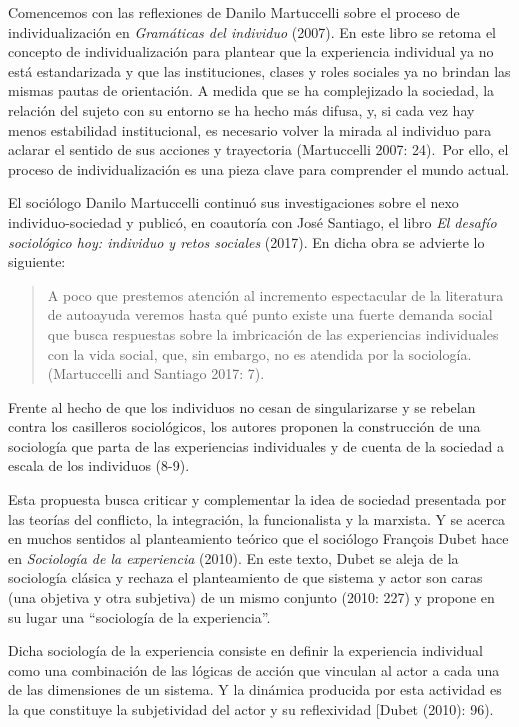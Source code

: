 \documentclass[
]{interact}
\begin{document}
Comencemos con las reflexiones de Danilo Martuccelli sobre el proceso de
individualización en \emph{Gramáticas del individuo} (2007). En este
libro se retoma el concepto de individualización para plantear que la
experiencia individual ya no está estandarizada y que las instituciones,
clases y roles sociales ya no brindan las mismas pautas de orientación.
A medida que se ha complejizado la sociedad, la relación del sujeto con
su entorno se ha hecho más difusa, y, si cada vez hay menos estabilidad
institucional, es necesario volver la mirada al individuo para aclarar
el sentido de sus acciones y trayectoria (Martuccelli 2007: 24).~Por
ello, el proceso de individualización es una pieza clave para comprender
el mundo actual.

El sociólogo Danilo Martuccelli continuó sus investigaciones sobre el
nexo individuo-sociedad y publicó, en coautoría con José Santiago, el
libro \emph{El desafío sociológico hoy: individuo y retos sociales}
(2017). En dicha obra se advierte lo siguiente:

\begin{quote}
A poco que prestemos atención al incremento espectacular de la
literatura de autoayuda veremos hasta qué punto existe una fuerte
demanda social que busca respuestas sobre la imbricación de las
experiencias individuales con la vida social, que, sin embargo, no es
atendida por la sociología. (Martuccelli and Santiago 2017: 7).
\end{quote}

Frente al hecho de que los individuos no cesan de singularizarse y se
rebelan contra los casilleros sociológicos, los autores proponen la
construcción de una sociología que parta de las experiencias
individuales y de cuenta de la sociedad a escala de los individuos
(8-9).

Esta propuesta busca criticar y complementar la idea de sociedad
presentada por las teorías del conflicto, la integración, la
funcionalista y la marxista. Y se acerca en muchos sentidos al
planteamiento teórico que el sociólogo François Dubet hace en
\emph{Sociología de la experiencia} (2010). En este texto, Dubet se
aleja de la sociología clásica y rechaza el planteamiento de que sistema
y actor son caras (una objetiva y otra subjetiva) de un mismo conjunto
(2010: 227) y propone en su lugar una ``sociología de la experiencia''.

Dicha sociología de la experiencia consiste en definir la experiencia
individual como una combinación de las lógicas de acción que vinculan al
actor a cada una de las dimensiones de un sistema. Y la dinámica
producida por esta actividad es la que constituye la subjetividad del
actor y su reflexividad {[}Dubet (2010): 96).
\end{document}
